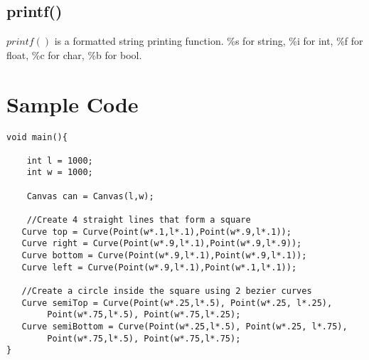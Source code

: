 \documentclass{article}
\begin{document}
\subsection{printf()}
$printf()$ is a formatted string printing function. \%s for string, \%i for int, \%f for float, \%c for char, \%b for bool.

\section{Sample Code}



\begin{verbatim}
void main(){
    
    int l = 1000;
    int w = 1000;
    
    Canvas can = Canvas(l,w);
    
    //Create 4 straight lines that form a square
   Curve top = Curve(Point(w*.1,l*.1),Point(w*.9,l*.1));
   Curve right = Curve(Point(w*.9,l*.1),Point(w*.9,l*.9));
   Curve bottom = Curve(Point(w*.9,l*.1),Point(w*.9,l*.1));
   Curve left = Curve(Point(w*.9,l*.1),Point(w*.1,l*.1));
   
   //Create a circle inside the square using 2 bezier curves
   Curve semiTop = Curve(Point(w*.25,l*.5), Point(w*.25, l*.25),
        Point(w*.75,l*.5), Point(w*.75,l*.25);
   Curve semiBottom = Curve(Point(w*.25,l*.5), Point(w*.25, l*.75),
        Point(w*.75,l*.5), Point(w*.75,l*.75);
}
\end{verbatim}
\end{document}
